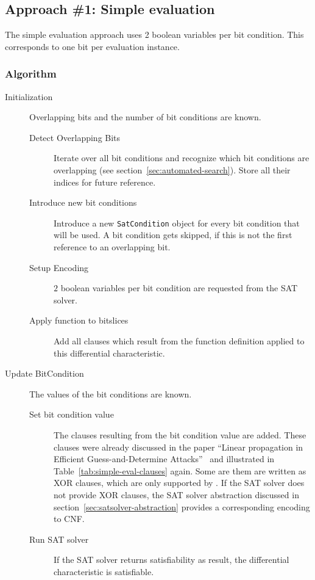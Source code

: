 \subsection{Approach \#1: Simple evaluation}
\label{sec:encoding:simple-evaluation}
%
The simple evaluation approach uses 2 boolean variables per bit condition. This corresponds to one bit per evaluation instance.

\subsubsection{Algorithm}
\label{sec:simple-evaluation-algorithm}
%
\begin{description}
  \item[Initialization] Overlapping bits and the number of bit conditions are known.
    \begin{description}
      \item[Detect Overlapping Bits] Iterate over all bit conditions and recognize which bit conditions are overlapping (see section~\ref{sec:automated-search}). Store all their indices for future reference.
      \item[Introduce new bit conditions] Introduce a new \texttt{SatCondition} object for every bit condition that will be used. A bit condition gets skipped, if this is not the first reference to an overlapping bit.
      \item[Setup Encoding] $2$ boolean variables per bit condition are requested from the SAT solver.
      \item[Apply function to bitslices] Add all clauses which result from the function definition applied to this differential characteristic.
    \end{description}
  \item[Update BitCondition] The values of the bit conditions are known.
    \begin{description}
      \item[Set bit condition value] The clauses resulting from the bit condition value are added. These clauses were already discussed in the paper ``Linear propagation in Efficient Guess-and-Determine Attacks''~\cite[6]{Cry16} and illustrated in Table~\ref{tab:simple-eval-clauses} again. Some are them are written as XOR clauses, which are only supported by \cmsat{}. If the SAT solver does not provide XOR clauses, the SAT solver abstraction discussed in section~\ref{sec:satsolver-abstraction} provides a corresponding encoding to CNF.
      \item[Run SAT solver] If the SAT solver returns satisfiability as result, the differential characteristic is satisfiable.
    \end{description}
\end{description}

